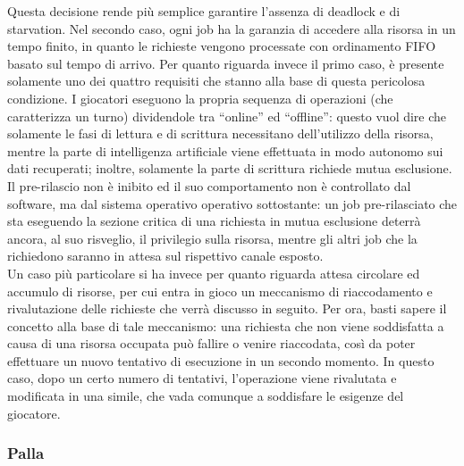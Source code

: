 Questa decisione rende più semplice garantire l'assenza di deadlock e di starvation. Nel secondo caso, ogni job ha la garanzia di accedere alla risorsa in un tempo finito, in quanto le richieste vengono processate con ordinamento FIFO basato sul tempo di arrivo. Per quanto riguarda invece il primo caso, è presente solamente uno dei quattro requisiti che stanno alla base di questa pericolosa condizione. I giocatori eseguono la propria sequenza di operazioni (che caratterizza un turno) dividendole tra ``online'' ed ``offline'': questo vuol dire che solamente le fasi di lettura e di scrittura necessitano dell'utilizzo della risorsa, mentre la parte di intelligenza artificiale viene effettuata in modo autonomo sui dati recuperati; inoltre, solamente la parte di scrittura richiede mutua esclusione. Il pre-rilascio non è inibito ed il suo comportamento non è controllato dal software, ma dal sistema operativo operativo sottostante: un job pre-rilasciato che sta eseguendo la sezione critica di una richiesta in mutua esclusione deterrà ancora, al suo risveglio, il privilegio sulla risorsa, mentre gli altri job che la richiedono saranno in attesa sul rispettivo canale esposto.\\

Un caso più particolare si ha invece per quanto riguarda attesa circolare ed accumulo di risorse, per cui entra in gioco un meccanismo di riaccodamento e rivalutazione delle richieste che verrà discusso in seguito. Per ora, basti sapere il concetto alla base di tale meccanismo: una richiesta che non viene soddisfatta a causa di una risorsa occupata può fallire o venire riaccodata, così da poter effettuare un nuovo tentativo di esecuzione in un secondo momento. In questo caso, dopo un certo numero di tentativi, l'operazione viene rivalutata e modificata in una simile, che vada comunque a soddisfare le esigenze del giocatore.

\subsubsection{Palla}
\label{sec:analisi_concorrenza_palla}

